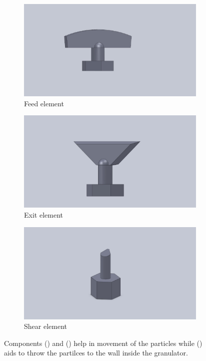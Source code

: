 \documentclass[preprint,11pt,authoryear]{elsarticle}
\begin{document}
\begin{figure}[H]
\begin{subfigure}{.3\textwidth}
\centering
\includegraphics[scale=0.075]{feed_element.pdf}	      
\caption{Feed element}
\label{fig:mthds_dem_feed_element}
\end{subfigure}%
\begin{subfigure}{.3\textwidth}
	\centering
	\includegraphics[scale=0.075]{exit_element.pdf}
	\caption{Exit element}
	\label{fig:mthds_dem_exit_element}
\end{subfigure}
\begin{subfigure}{.3\textwidth}
\centering
\includegraphics[scale=0.075]{shear_element.pdf}
\caption{Shear element}
\label{fig:mthds_dem_shear_element}
\end{subfigure}
\caption{Components () and () help in 
movement of the particles while () aids to throw the partilces to the wall 
inside the granulator.}
\label{fig:mthds_dem_charles_fig5pt3and4_blades_n_isometric}
\end{figure}     
\end{document}
